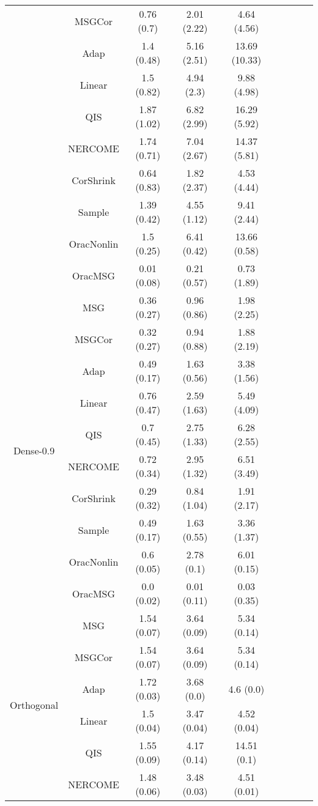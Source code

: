 \documentclass[useAMS,referee,usenatbib]{biom}
\begin{document}
\begin{table}[H]
{\begin{tabular}{ccccccccc}
 & MSGCor   & 0.76 (0.7)  & 2.01 (2.22) & 4.64 (4.56)   \\
 & Adap     & 1.4 (0.48)  & 5.16 (2.51) & 13.69 (10.33) \\
 & Linear         & 1.5 (0.82)  & 4.94 (2.3)  & 9.88 (4.98)   \\
 & QIS            & 1.87 (1.02) & 6.82 (2.99) & 16.29 (5.92)  \\
 & NERCOME        & 1.74 (0.71) & 7.04 (2.67) & 14.37 (5.81)  \\
 & CorShrink      & 0.64 (0.83) & 1.82 (2.37) & 4.53 (4.44)   \\
 & Sample            & 1.39 (0.42) & 4.55 (1.12) & 9.41 (2.44)   \\
 & OracNonlin & 1.5 (0.25)  & 6.41 (0.42) & 13.66 (0.58)  \\
 & OracMSG  & 0.01 (0.08) & 0.21 (0.57) & 0.73 (1.89) \\ \midrule
\multirow{10}{*}{Dense-0.9}  
 & MSG & 0.36 (0.27) & 0.96 (0.86) & 1.98 (2.25) \\
 & MSGCor   & 0.32 (0.27) & 0.94 (0.88) & 1.88 (2.19) \\
 & Adap     & 0.49 (0.17) & 1.63 (0.56) & 3.38 (1.56) \\
 & Linear         & 0.76 (0.47) & 2.59 (1.63) & 5.49 (4.09) \\
 & QIS            & 0.7 (0.45)  & 2.75 (1.33) & 6.28 (2.55) \\
 & NERCOME        & 0.72 (0.34) & 2.95 (1.32) & 6.51 (3.49) \\
 & CorShrink      & 0.29 (0.32) & 0.84 (1.04) & 1.91 (2.17) \\
 & Sample            & 0.49 (0.17) & 1.63 (0.55) & 3.36 (1.37) \\
 & OracNonlin & 0.6 (0.05)  & 2.78 (0.1)  & 6.01 (0.15) \\
 & OracMSG  & 0.0 (0.02)  & 0.01 (0.11) & 0.03 (0.35) \\ \midrule
\multirow{10}{*}{Orthogonal}  
 & MSG & 1.54 (0.07) & 3.64 (0.09) & 5.34 (0.14)  \\
 & MSGCor   & 1.54 (0.07) & 3.64 (0.09) & 5.34 (0.14)  \\
 & Adap     & 1.72 (0.03) & 3.68 (0.0)  & 4.6 (0.0)    \\
 & Linear         & 1.5 (0.04)  & 3.47 (0.04) & 4.52 (0.04)  \\
 & QIS            & 1.55 (0.09) & 4.17 (0.14) & 14.51 (0.1)  \\
 & NERCOME        & 1.48 (0.06) & 3.48 (0.03) & 4.51 (0.01)  \\

\end{tabular}}
\end{table}
\end{document}
